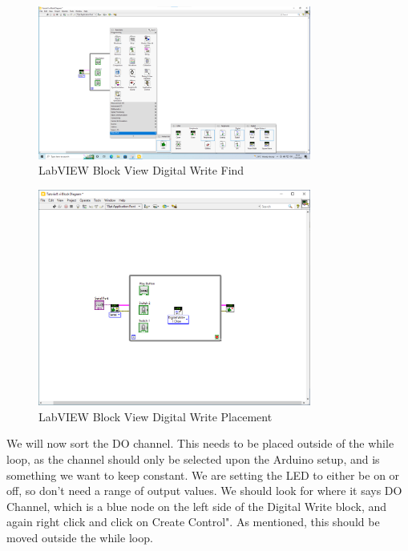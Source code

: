 \documentclass[a4paper,11pt]{report}
\begin{document}
\begin{figure}[H]
\centering
\includegraphics[width=0.8\textwidth]{screenshots/labview17}
\caption{LabVIEW Block View Digital Write Find}
\end{figure}

\begin{figure}[H]
\centering
\includegraphics[width=0.8\textwidth]{screenshots/labview19}
\caption{LabVIEW Block View Digital Write Placement}
\end{figure}

We will now sort the DO channel. This needs to be placed outside of the while loop, as the channel should only be selected upon the Arduino setup, and is something we want to keep constant. We are setting the LED to either be on or off, so don't need a range of output values. We should look for where it says DO Channel, which is a blue node on the left side of the Digital Write block, and again right click and click on Create Control". As mentioned, this should be moved outside the while loop.
\end{document}
